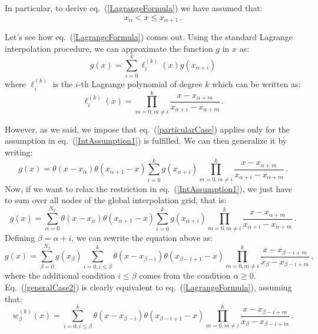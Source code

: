\documentclass[10pt,a4paper]{article}
\begin{document}
In particular, to derive eq.~(\ref{LagrangeFormula}) we have assumed
that:
\begin{equation}\label{IntAssumption1}
x_\alpha < x \leq x_{\alpha+1}\,.
\end{equation}

Let's see how eq.~(\ref{LagrangeFormula}) comes out. Using the
standard Lagrange interpolation procedure, we can approximate the
function $g$ in $x$ as:
\begin{equation}\label{particularCase}
g(x) = \sum_{i=0}^k\ell_i^{(k)}(x)g(x_{\alpha+i})
\end{equation}
where $\ell_i^{(k)}$ is the $i$-th Lagrange polynomial of degree $k$
which can be written as:
\begin{equation}
\ell_i^{(k)}(x) = \prod^{k}_{m=0,m\ne i}\frac{x-x_{\alpha+m}}{x_{\alpha+i}-x_{\alpha+m}}\,.
\end{equation}

However, as we said, we impose that eq.~(\ref{particularCase}) applies
only for the assumption in eq.~(\ref{IntAssumption1}) is fulfilled. We
can then generalize it by writing:
\begin{equation}\label{particularCaseTheta}
g(x) = \theta(x-x_{\alpha})\theta(x_{\alpha+1}-x)\sum_{i=0}^k g(x_{\alpha+i})\prod^{k}_{m=0,m\ne i}\frac{x-x_{\alpha+m}}{x_{\alpha+i}-x_{\alpha+m}}\,.
\end{equation}
Now, if we want to relax the restriction in eq.~(\ref{IntAssumption1}), we just have to sum over all nodes of the global interpolation grid, that is:
\begin{equation}\label{generalCase}
g(x) = \sum_{\alpha=0}^{N_x}\theta(x-x_{\alpha})\theta(x_{\alpha+1}-x)\sum_{i=0}^k g(x_{\alpha+i})\prod^{k}_{m=0,m\ne i}\frac{x-x_{\alpha+m}}{x_{\alpha+i}-x_{\alpha+m}}\,.
\end{equation}
Defining $\beta=\alpha+i$, we can rewrite the equation above as:
\begin{equation}\label{generalCase2}
g(x) = \sum_{\beta=0}^{N_x}g(x_{\beta}) \sum_{i=0,i\leq\beta}^k \theta(x-x_{\beta-i})\theta(x_{\beta-i+1}-x) \prod^{k}_{m=0,m\ne i}\frac{x-x_{\beta-i+m}}{x_{\beta}-x_{\beta-i+m}}\,,
\end{equation}
where the additional condition $i\leq\beta$ comes from the condition
$\alpha\geq 0$. Eq.~(\ref{generalCase2}) is clearly equivalent to
eq.~(\ref{LagrangeFormula}), assuming that:
\begin{equation}
w_\beta^{(k)}(x) = \sum_{i=0,i\leq\beta}^k \theta(x-x_{\beta-i})\theta(x_{\beta-i+1}-x) \prod^{k}_{m=0,m\ne i}\frac{x-x_{\beta-i+m}}{x_{\beta}-x_{\beta-i+m}}\,.
\end{equation}
\end{document}
